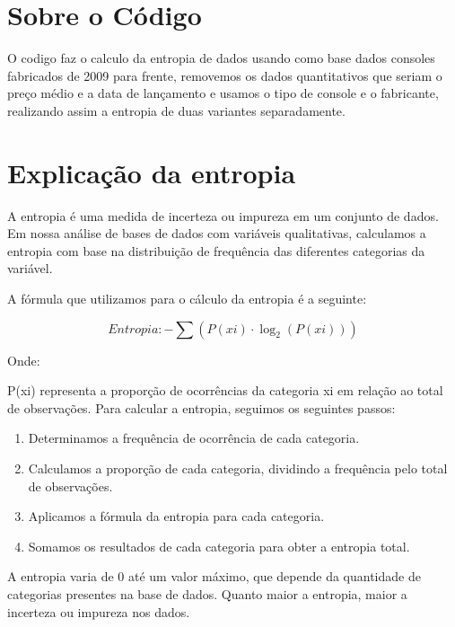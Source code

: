 \section*{\Large Sobre o Código}


O codigo faz o calculo da entropia de dados usando como base dados consoles fabricados de 2009 para frente, removemos os dados quantitativos que seriam o preço médio e a data de lançamento e usamos o tipo de console e o fabricante, realizando assim a entropia de duas variantes separadamente.

\onehalfspacing

\section*{\Large Explicação da entropia}
A entropia é uma medida de incerteza ou impureza em um conjunto de dados. Em nossa análise de bases de dados com variáveis qualitativas, calculamos a entropia com base na distribuição de frequência das diferentes categorias da variável.

\vspace{0.5cm}

A fórmula que utilizamos para o cálculo da entropia é a seguinte:

\[
Entropia: - \sum (P(xi) \cdot \log_2(P(xi)))
\]

Onde:

P(xi) representa a proporção de ocorrências da categoria xi em relação ao total de observações.
Para calcular a entropia, seguimos os seguintes passos:

\vspace{0.5cm}

\begin{enumerate}
\item \hspace{0.5cm} Determinamos a frequência de ocorrência de cada categoria.
\item \hspace{0.5cm} Calculamos a proporção de cada categoria, dividindo a frequência pelo total de observações.
\item \hspace{0.5cm} Aplicamos a fórmula da entropia para cada categoria.
\item \hspace{0.5cm} Somamos os resultados de cada categoria para obter a entropia total.
\end{enumerate}

A entropia varia de 0 até um valor máximo, que depende da quantidade de categorias presentes na base de dados. Quanto maior a entropia, maior a incerteza ou impureza nos dados.

